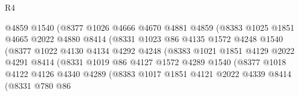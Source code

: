\begin{lexlean}{R4}
\begin{coremodule}
                              @4859
                              @1540
                              (@8377
                                @1026
                                @4666
                                @4670
                                @4881
                                @4859
                                (@8383
                                  @1025
                                  @1851
                                  @4665
                                  @2022
                                  @4880
                                  @8414
                                  (@8331
                                    @1023
                                    @86
                                    @4135
                                    @1572
                                    @4248
                                    @1540
                                    (@8377
                                      @1022
                                      @4130
                                      @4134
                                      @4292
                                      @4248
                                      (@8383
                                        @1021
                                        @1851
                                        @4129
                                        @2022
                                        @4291
                                        @8414
                                        (@8331
                                          @1019
                                          @86
                                          @4127
                                          @1572
                                          @4289
                                          @1540
                                          (@8377
                                            @1018
                                            @4122
                                            @4126
                                            @4340
                                            @4289
                                            (@8383
                                              @1017
                                              @1851
                                              @4121
                                              @2022
                                              @4339
                                              @8414
                                              (@8331
                                                @780
                                                @86

\end{coremodule}
\end{lexlean}
